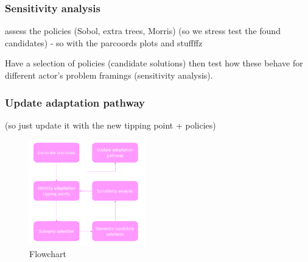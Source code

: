 \subsubsection{Sensitivity analysis}
assess the policies (Sobol, extra trees, Morris) (so we stress test the found candidates) - so with the parcoords plots and stuffffz

Have a selection of policies (candidate solutions) then test how these behave for different actor's problem framings (sensitivity analysis).

\subsubsection{Update adaptation pathway}
(so just update it with the new tipping point + policies)

\begin{figure}[h!]
    \centering
    \includegraphics[width=0.45\textwidth]{report/figures/flowchart.png} 
    \caption{Flowchart}
    \label{fig:flowchart}
\end{figure}







